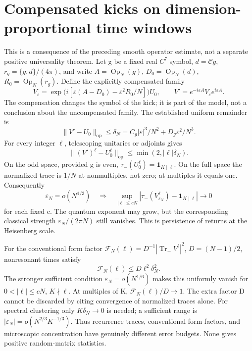 \section{Compensated kicks on dimension-proportional time windows}
\label{sec:compensated-time}
This is a consequence of the preceding smooth operator estimate, not a
separate positive universality theorem. Let g be a fixed real $C^7$ symbol,
$d=\mathcal Cg$, $r_g=\{g,d\}/(4\pi)$, and write
$A=\operatorname{Op}_N(g)$, $D_0=\operatorname{Op}_N(d)$,
$R_0=\operatorname{Op}_N(r_g)$. Define the explicitly compensated family
\[
 V_\varepsilon=\exp\bigl(i[\varepsilon(A-D_0)-\varepsilon^2R_0/N]\bigr)U_0,
 \qquad V'=e^{-i\varepsilon A}V_\varepsilon e^{i\varepsilon A}.
\]
The compensation changes the symbol of the kick; it is part of the model,
not a conclusion about the uncompensated family. The established uniform
remainder is
\[
 \|V'-U_0\|_{\mathrm{op}}\leq\delta_N
 =C_g|\varepsilon|^3/N^2+D_g\varepsilon^2/N^3.
\]
For every integer $\ell$, telescoping unitaries or adjoints gives
\[
 \|(V')^\ell-U_0^\ell\|_{\mathrm{op}}
             \leq\min(2,|\ell|\delta_N).
\]
On the odd space, provided g is even,
$\tau_-(U_0^\ell)=\mathbf1_{K\mid\ell}$. On the full space the normalized
trace is $1/N$ at nonmultiples, not zero; at multiples it equals one.
Consequently
\[
 \varepsilon_N=o(N^{1/3})\quad\Longrightarrow\quad
 \sup_{|\ell|\leq cN}
 |\tau_-(V_{\varepsilon_N}^\ell)-\mathbf1_{K\mid\ell}|\longrightarrow0
\]
for each fixed c. The quantum exponent may grow, but the corresponding
classical strength $\varepsilon_N/(2\pi N)$ still vanishes.
This is persistence of returns at the Heisenberg scale.

For the conventional form factor
$\mathcal F_N(\ell)=D^{-1}|\operatorname{Tr}_-V^\ell|^2$,
$D=(N-1)/2$, nonresonant times satisfy
\[
 \mathcal F_N(\ell)\leq D\ell^2\delta_N^2.
\]
The stronger sufficient condition $\varepsilon_N=o(N^{1/6})$ makes this
uniformly vanish for $0<|\ell|\leq cN$, $K\nmid\ell$.
At multiples of K, $\mathcal F_N(\ell)/D\to1$. The extra factor D cannot
be discarded by citing convergence of normalized traces alone.
For spectral clustering only $K\delta_N\to0$ is needed; a sufficient range
is $|\varepsilon_N|=o(N^{2/3}K^{-1/3})$. Thus recurrence traces,
conventional form factors, and microscopic concentration have genuinely
different error budgets. None gives positive random-matrix statistics.
